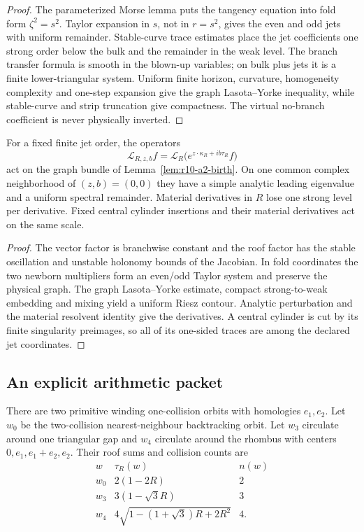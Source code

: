 \begin{proof}
The parameterized Morse lemma puts the tangency equation into fold form
\(\zeta^2=s^2\).  Taylor expansion in \(s\), not in \(r=s^2\), gives the even
and odd jets with uniform remainder.  Stable-curve trace estimates place the
jet coefficients one strong order below the bulk and the remainder in the
weak level.  The branch transfer formula is smooth in the blown-up variables;
on bulk plus jets it is a finite lower-triangular system.  Uniform finite
horizon, curvature, homogeneity complexity and one-step expansion give the
graph Lasota--Yorke inequality, while stable-curve and strip truncation give
compactness.  The virtual no-branch coefficient is never physically inverted.
\end{proof}

\begin{theorem}
\label{thm:r10-a2-spectral}
For a fixed finite jet order, the operators
\[
 \mathcal L_{R,z,b}f
 =\mathcal L_R\bigl(e^{z\cdot\kappa_R+ib\tau_R}f\bigr)
\]
act on the graph bundle of Lemma~\ref{lem:r10-a2-birth}.  On one common
complex neighborhood of \((z,b)=(0,0)\) they have a simple analytic leading
eigenvalue and a uniform spectral remainder.  Material derivatives in \(R\)
lose one strong level per derivative.  Fixed central cylinder insertions and
their material derivatives act on the same scale.
\end{theorem}

\begin{proof}
The vector factor is branchwise constant and the roof factor has the stable
oscillation and unstable holonomy bounds of the Jacobian.  In fold coordinates
the two newborn multipliers form an even/odd Taylor system and preserve the
physical graph.  The graph Lasota--Yorke estimate, compact strong-to-weak
embedding and mixing yield a uniform Riesz contour.  Analytic perturbation and
the material resolvent identity give the derivatives.  A central cylinder is
cut by its finite singularity preimages, so all of its one-sided traces are
among the declared jet coordinates.
\end{proof}

\subsection{An explicit arithmetic packet}

There are two primitive winding one-collision orbits with homologies
\(e_1,e_2\).  Let \(w_0\) be the two-collision nearest-neighbour backtracking
orbit.  Let \(w_3\) circulate around one triangular gap and \(w_4\) circulate
around the rhombus with centers \(0,e_1,e_1+e_2,e_2\).  Their roof sums and
collision counts are
\[
 \begin{array}{c|c|c}
 w&\tau_R(w)&n(w)\\ \hline
 w_0&2(1-2R)&2\\
 w_3&3(1-\sqrt3R)&3\\
 w_4&4\sqrt{1-(1+\sqrt3)R+2R^2}&4.
 \end{array}
\]

